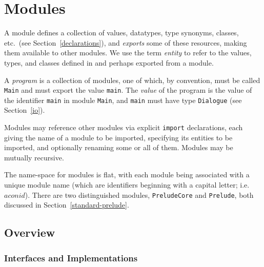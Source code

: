 %
%
\section{Modules} 
\label{modules} 

A module defines a collection of values, datatypes, type synonyms,
classes, etc.~(see Section~\ref{declarations}),
and {\em exports} some of these resources, making them available to
other modules.  We use the term {\em entity} to refer to
the values, types, and classes defined in and perhaps exported from a
module.

A \Haskell{} {\em program} is a collection of modules, one of
which, by convention, must be called \mbox{\tt Main} and must
export the value \mbox{\tt main}.  The {\em value} of the program
is the value of the identifier \mbox{\tt main} in module \mbox{\tt Main}, and \mbox{\tt main}
must have type \mbox{\tt Dialogue} (see Section~\ref{io}).


Modules may reference other modules via explicit
\mbox{\tt import} declarations, each giving the name of a module to be
imported, specifying its entities to be imported, and
optionally renaming some or all of them.  Modules may be mutually
recursive.

The name-space for modules is flat, with each module being associated
with a unique module name (which are \Haskell{} identifiers
beginning with a capital letter; i.e.~$aconid$).  There are two
distinguished modules, \mbox{\tt PreludeCore} and \mbox{\tt Prelude}, both
discussed in Section~\ref{standard-prelude}.

\subsection{Overview}
\label{module-structure}

\subsubsection{Interfaces and Implementations}

